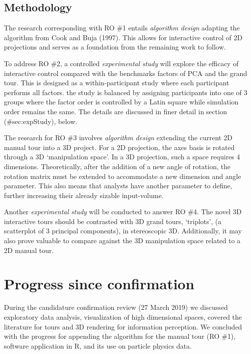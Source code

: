 \documentclass[
  11,
]{article}
\begin{document}
\hypertarget{methodology}{%
\subsection{Methodology}\label{methodology}}

The research corresponding with RO \#1 entails \emph{algorithm design} adapting the algorithm from Cook and Buja (1997). This allows for interactive control of 2D projections and serves as a foundation from the remaining work to follow.

To address RO \#2, a controlled \emph{experimental study} will explore the efficacy of interactive control compared with the benchmarks factors of PCA and the grand tour. This is designed as a within-participant study where each participant performs all factors. the study is balanced by assigning participants into one of 3 groups where the factor order is controlled by a Latin square while simulation order remains the same. The details are discussed in finer detail in section (\#sec:expStudy), below.

The research for RO \#3 involves \emph{algorithm design} extending the current 2D manual tour into a 3D project. For a 2D projection, the axes basis is rotated through a 3D `manipulation space'. In a 3D projection, such a space requires 4 dimensions. Theoretically, after the addition of a new angle of rotation, the rotation matrix must be extended to accommodate a new dimension and angle parameter. This also means that analysts have another parameter to define, further increasing their already sizable input-volume.

Another \emph{experimental study} will be conducted to answer RO \#4. The novel 3D interactive tours should be contrasted with 3D grand tours, `triplots', (a scatterplot of 3 principal components), in stereoscopic 3D. Additionally, it may also prove valuable to compare against the 3D manipulation space related to a 2D manual tour.

\hypertarget{progress-since-confirmation}{%
\section{Progress since confirmation}\label{progress-since-confirmation}}

During the candidature confirmation review (27 March 2019) we discussed exploratory data analysis, visualization of high dimensional spaces, covered the literature for tours and 3D rendering for information perception. We concluded with the progress for appending the algorithm for the manual tour (RO \#1), software application in R, and its use on particle physics data.
\end{document}
